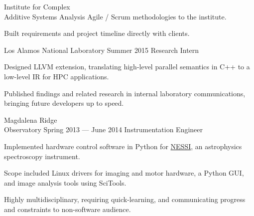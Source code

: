 \documentclass{tc_cv}
\newcommand{\jobSpace}{\vspace{0.75em}}
\begin{document}
\begin{minipage}[t]{0.6\linewidth}
\begin{job}{Institute for Complex \\ Additive Systems Analysis}
      Agile / Scrum methodologies to the institute.
    \item Built requirements and project timeline directly with clients.
  \end{job}
  \jobSpace
  \begin{job}{Los Alamos National Laboratory}
    {Summer 2015}
    {Research Intern}
    \item Designed LLVM extension, translating high-level parallel semantics
      in C++ to a low-level IR for HPC applications.
    \item Published findings and related research in internal laboratory
      communications, bringing future developers up to speed.
  \end{job}
  \jobSpace
  \begin{job}{Magdalena Ridge \\ Observatory}
    {Spring 2013 --- June 2014}
    {Instrumentation Engineer}
    \item Implemented hardware control software in Python for
      \href{https://noirlab.edu/public/programs/kitt-peak-national-observatory/wiyn-35m-telescope/nessi/}{NESSI},
      an astrophysics spectroscopy instrument.
    \item Scope included Linux drivers for imaging and motor hardware, a Python
      GUI, and image analysis tools using SciTools.
    \item Highly multidisciplinary, requiring quick-learning, and communicating
      progress and constraints to non-software audience.
  \end{job}
\end{minipage}
\end{document}
